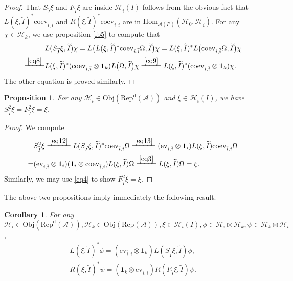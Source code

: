 \documentclass[12pt,a4paper]{article}
\theoremstyle{definition}
\theoremstyle{plain}
\newtheorem{pp}[df]{Proposition}
\newtheorem{co}[df]{Corollary}
\newcommand{\mc}{\mathcal}
\newcommand{\wtd}{\widetilde}
\newcommand{\ovl}{\overline}
\newcommand{\id}{\mathbf{1}}
\newcommand{\Hom}{\mathrm{Hom}}
\newcommand{\ev}{\mathrm{ev}}
\newcommand{\coev}{\mathrm{coev}}
\newcommand{\RepA}{\mathrm{Rep}(\mc A)}
\newcommand{\RepdA}{\mathrm{Rep}^{\mathrm d}(\mc A)}
\newcommand{\Obj}{\mathrm{Obj}}
\numberwithin{equation}{section}
\begin{document}
\begin{proof}
That $S_{\wtd I}\xi$ and $F_{\wtd I}\xi$ are inside $\mc H_{\ovl i}(I)$ follows from the obvious fact that $L(\xi,\wtd I)^*\coev_{i,\ovl i}$ and $R(\xi,\wtd I)^*\coev_{\ovl i,i}$ are in $\Hom_{\mc A(I')}(\mc H_0,\mc H_{\ovl i})$. For any $\chi\in\mc H_k$, we use proposition \ref{lb5} to compute that
\begin{align*}
&L(S_{\wtd I}\xi,\wtd I)\chi=L\big(L(\xi,\wtd I)^*\coev_{i,\ovl i}\Omega,\wtd I\big)\chi=L(\xi,\wtd I)^*L\big(\coev_{i,\ovl i}\Omega,\wtd I\big)\chi\\
\xlongequal{\eqref{eq8}}&L(\xi,\wtd I)^*(\coev_{i,\ovl i}\otimes\id_k)L\big(\Omega,\wtd I\big)\chi\xlongequal{\eqref{eq9}}L(\xi,\wtd I)^*(\coev_{i,\ovl i}\otimes\id_k)\chi.
\end{align*}
The other equation is proved similarly.	
\end{proof}



\begin{pp}\label{lb6}
For any $\mc H_i\in\Obj(\RepdA)$ and $\xi\in\mc H_i(I)$, we have $S_{\wtd I}^2\xi=F_{\wtd I}^2\xi=\xi$.
\end{pp}

\begin{proof}
We compute
\begin{align*}
&S_{\wtd I}^2\xi\xlongequal{\eqref{eq12}}L(S_{\wtd I}\xi,\wtd I)^*\coev_{\ovl i,i}\Omega\xlongequal{\eqref{eq13}} (\ev_{i,\ovl i}\otimes\id_i)L(\xi,\wtd I)\coev_{\ovl i,i}\Omega\\
=&(\ev_{i,\ovl i}\otimes\id_i)(\id_i\otimes\coev_{\ovl i,i})L(\xi,\wtd I)\Omega\xlongequal{\eqref{eq3}} L(\xi,\wtd I)\Omega=\xi.
\end{align*}
Similarly, we may use \eqref{eq4} to show $F_{\wtd I}^2\xi=\xi$.
\end{proof}

The above two propositions imply immediately the following result.

\begin{co}
For any $\mc H_i\in\Obj(\RepdA),\mc H_k\in\Obj(\RepA),\xi\in\mc H_i(I),\phi\in\mc H_i\boxtimes\mc H_k,\psi\in\mc H_k\boxtimes\mc H_i$,
\begin{gather}
L(\xi,\wtd I)^*\phi=(\ev_{\ovl i,i}\otimes\id_k)L(S_{\wtd I}\xi,\wtd I)\phi,\label{eq16}\\
R(\xi,\wtd I)^*\psi=(\id_k\otimes\ev_{i,\ovl i})R(F_{\wtd I}\xi,\wtd I)\psi.\label{eq17}
\end{gather}
\end{co}
\end{document}

